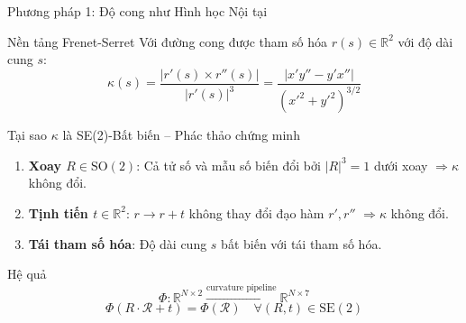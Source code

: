 \documentclass[aspectratio=169,10pt]{beamer}
\begin{document}
\begin{frame}{Phương pháp 1: Độ cong như Hình học Nội tại}
\begin{block}{Nền tảng Frenet-Serret}
\scriptsize
Với đường cong được tham số hóa $r(s) \in \mathbb{R}^2$ với độ dài cung $s$:
\[
\kappa(s) = \frac{|r'(s) \times r''(s)|}{|r'(s)|^3} = \frac{|x'y'' - y'x''|}{(x'^2 + y'^2)^{3/2}}
\]
\end{block}

\begin{block}{Tại sao $\kappa$ là SE(2)-Bất biến -- Phác thảo chứng minh}
\scriptsize
\begin{enumerate}
  \item \textbf{Xoay $R \in \mathrm{SO}(2)$}: Cả tử số và mẫu số biến đổi bởi $|R|^3 = 1$ dưới xoay $\Rightarrow \kappa$ không đổi.
  
  \item \textbf{Tịnh tiến $t \in \mathbb{R}^2$}: $r \to r + t$ không thay đổi đạo hàm $r', r''$ $\Rightarrow \kappa$ không đổi.
  
  \item \textbf{Tái tham số hóa}: Độ dài cung $s$ bất biến với tái tham số hóa.
\end{enumerate}
\end{block}

\begin{block}{Hệ quả}
\[
\Phi: \mathbb{R}^{N \times 2} \xrightarrow{\text{curvature pipeline}} \mathbb{R}^{N \times 7}
\]
\[
\Phi(R \cdot \mathcal{R} + t) = \Phi(\mathcal{R}) \quad \forall (R,t) \in \mathrm{SE}(2)
\]
\end{block}
\end{frame}
\end{document}
